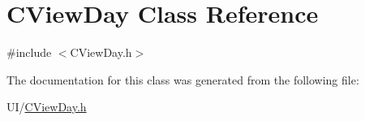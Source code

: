 \hypertarget{class_c_view_day}{}\section{C\+View\+Day Class Reference}
\label{class_c_view_day}


{\ttfamily \#include $<$C\+View\+Day.\+h$>$}



The documentation for this class was generated from the following file\+:\begin{DoxyCompactItemize}
\item 
U\+I/\mbox{\hyperlink{_c_view_day_8h}{C\+View\+Day.\+h}}\end{DoxyCompactItemize}
